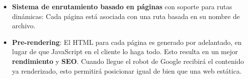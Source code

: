 \documentclass[12pt,twoside,titlepage]{report}
\begin{document}
\begin{itemize}
    \item \textbf{Sistema de enrutamiento basado en páginas} con soporte para rutas dinámicas: Cada página está asociada con una ruta basada en su nombre de archivo. 

    \item \textbf{Pre-rendering}: El HTML para cada página es generado por adelantado, en lugar de que JavaScript en el cliente lo haga todo. Esto resulta en un mejor \textbf{rendimiento} y \textbf{SEO}. Cuando llegue el robot de Google recibirá el contenido ya renderizado, esto permitirá posicionar igual de bien que una web estática. 

\end{itemize}
\end{document}
